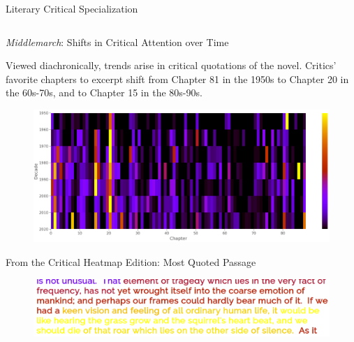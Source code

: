 \documentclass[final]{beamer}
\newlength{\onecolwid}
\newlength{\twocolwid}
\begin{document}
\begin{frame}[t]
\begin{columns}[t]
\begin{column}{\twocolwid}
\begin{columns}[t,totalwidth=\twocolwid]
\begin{column}{\onecolwid}
\begin{block}{Literary Critical Specialization}
\end{block}


\end{column} %

\end{columns} %


\begin{alertblock}{\emph{Middlemarch}: Shifts in Critical Attention over Time}

Viewed diachronically, trends arise in critical quotations of the novel. Critics' favorite chapters to excerpt shift from Chapter 81 in the 1950s to Chapter 20 in the 60s-70s, and to Chapter 15 in the 80s-90s. 

\begin{figure}
\includegraphics[width=0.8\linewidth]{diachronic.png}
\end{figure}

\end{alertblock} 



\begin{block}{From the Critical Heatmap Edition: Most Quoted Passage}

\begin{figure}
\includegraphics[width=0.7\linewidth]{most-quoted.png}
\end{figure}
\end{block} 


\end{column}
\end{columns}
\end{frame}
\end{document}
